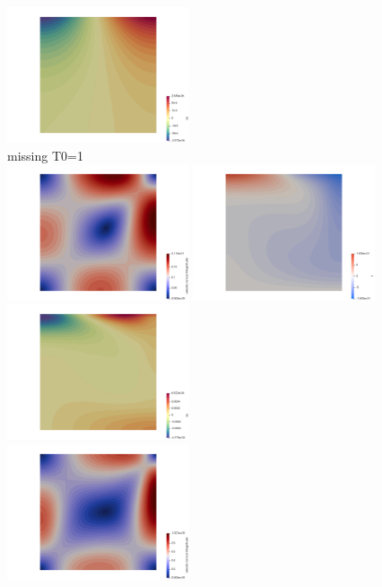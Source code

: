 \begin{center}
\includegraphics[height=4cm]{python_codes/fieldstone_38/results/T0_0p1_64x64/qy}\\
missing T0=1 \\
\includegraphics[height=4cm]{python_codes/fieldstone_38/results/T0_10_64x64/vel}
\includegraphics[height=4cm]{python_codes/fieldstone_38/results/T0_10_64x64/T}
\includegraphics[height=4cm]{python_codes/fieldstone_38/results/T0_10_64x64/qy}\\
\includegraphics[height=4cm]{python_codes/fieldstone_38/results/T0_100_64x64/vel}

\end{center}
